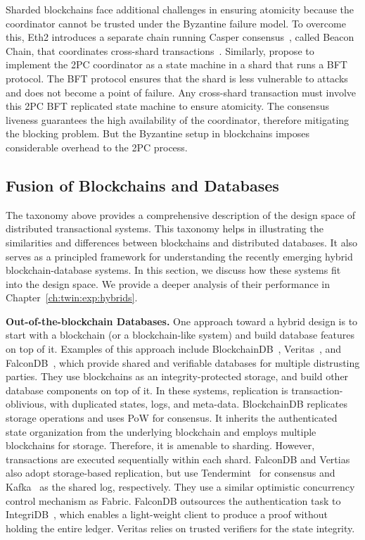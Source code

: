 Sharded blockchains face additional challenges in ensuring atomicity because the
coordinator cannot be trusted under the Byzantine failure model.
To overcome this, Eth2 introduces a separate chain running Casper
consensus~\cite{buterin2017casper}, called Beacon Chain, that coordinates
cross-shard transactions~\cite{web:eth2}.
Similarly, \cite{dang2018towards,herlihy2019cross} propose to implement the 2PC
coordinator as a state machine in a shard that runs a BFT protocol. The BFT
protocol ensures that the shard is less vulnerable to attacks and does not
become a point of failure.
Any cross-shard transaction must involve this 2PC BFT replicated state machine
to ensure atomicity.
The consensus liveness guarantees the high availability of the coordinator,
therefore mitigating the blocking problem.
But the Byzantine setup in blockchains imposes considerable overhead to the 2PC
process.

\subsection{Fusion of Blockchains and Databases}
The taxonomy above provides a comprehensive description of the design space of
distributed transactional systems. This taxonomy helps in illustrating the
similarities and differences between blockchains and distributed databases. It
also serves as a principled framework for understanding the recently emerging
hybrid blockchain-database systems. In this section, we discuss how these
systems fit into the design space. We provide a deeper analysis of their
performance in Chapter~\ref{ch:twin:exp:hybrids}.

\textbf{Out-of-the-blockchain Databases.} One approach toward a hybrid design is
to start with a blockchain (or a blockchain-like system) and build database
features on top of it. Examples of this approach include
BlockchainDB~\cite{el2019blockchaindb}, Veritas~\cite{veritas}, and
FalconDB~\cite{peng2020falcondb}, which provide shared and verifiable databases
for multiple distrusting parties.
They use blockchains as an integrity-protected storage, and build other database
components on top of it.
In these systems, replication is transaction-oblivious, with duplicated states,
logs, and meta-data.
BlockchainDB replicates storage operations and uses PoW for
consensus. It inherits the authenticated state organization from the underlying
blockchain and employs multiple blockchains for storage. Therefore, it is
amenable to sharding. However, transactions are executed sequentially within
each shard.
FalconDB and Vertias also adopt storage-based replication, but use
Tendermint~\cite{buchman2016tendermint} for consensus and Kafka~\cite{web:kafka}
as the shared log, respectively.
They use a similar optimistic concurrency control mechanism as Fabric. FalconDB
outsources the authentication task to IntegriDB~\cite{zhang2015integridb}, which
enables a light-weight client to produce a proof without holding the entire
ledger. Veritas relies on trusted verifiers for the state integrity.

